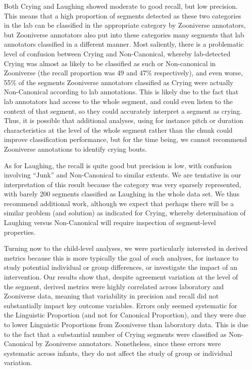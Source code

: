 \documentclass[english,,man]{apa6}
\begin{document}
Both Crying and Laughing showed moderate to good recall, but low precision. This means that a high proportion of segments detected as these two categories in the lab can be classified in the appropriate category by Zooniverse annotators, but Zooniverse annotators also put into these categories many segments that lab annotators classified in a different manner. Most saliently, there is a problematic level of confusion between Crying and Non-Canonical, whereby lab-detected Crying was almost as likely to be classified as such or Non-canonical in Zooniverse (the recall proportion was 49 and 47\% respectively), and even worse, 55\% of the segments Zooniverse annotators classified as Crying were actually Non-Canonical according to lab annotations. This is likely due to the fact that lab annotators had access to the whole segment, and could even listen to the context of that segment, so they could accurately interpret a segment as crying. Thus, it is possible that additional analyses, using for instance pitch or duration characteristics at the level of the whole segment rather than the chunk could improve classification performance, but for the time being, we cannot recommend Zooniverse annotations to identify crying bouts.

As for Laughing, the recall is quite good but precision is low, with confusion involving \enquote{Junk} and Non-Canonical to similar extents. We are tentative in our interpretation of this result because the category was very sparsely represented, with barely 200 segments classified as Laughing in the whole data set. We thus recommend additional work, although we expect that perhaps there will be a similar problem (and solution) as indicated for Crying, whereby determination of Laughing versus Non-Canonical will require inspection of segment-level properties.

Turning now to the child-level analyses, we were particularly interested in derived metrics because this is more typically the goal of such analyses, for instance to study potential individual or group differences, or investigate the impact of an intervention. Our results show that, despite agreement variation at the level of the segment, derived metrics were highly correlated across laboratory and Zooniverse data, meaning that variability in precision and recall did not substantially impact key outcome variables. Errors only seemed systematic for the Linguistic Proportion (and not for Canonical Proportion), and they were due to lower Linguistic Proportions from Zooniverse than laboratory data. This is due to the fact that a substantial number of Crying segments were classified as Non-Canonical by Zooniverse annotators. Nonetheless, since these errors were systematic across infants, they do not affect the study of group or individual variation.
\end{document}
